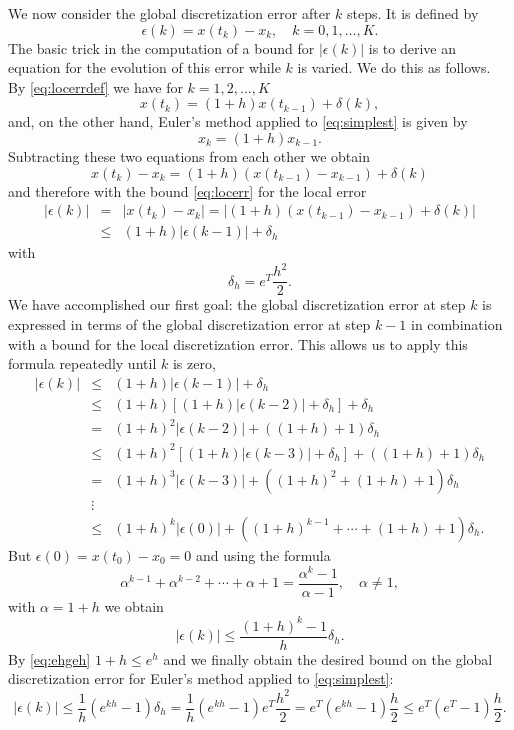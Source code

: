 \documentclass{ximera}
\begin{document}
We now consider the global discretization error after $k$ steps.
It is defined by 
\[
\epsilon(k) = x(t_k) - x_k,\quad k=0,1,\ldots,K.
\]
The basic trick in the computation of a bound for $|\epsilon(k)|$
is to derive an equation for the evolution of this
error while $k$ is varied.  We do this as follows.  
By \eqref{eq:locerrdef} we have for $k=1,2,\ldots,K$
\[
x(t_k)=(1+h)x(t_{k-1})+\delta(k), 
\]
and, on the other hand, Euler's method applied to
\eqref{eq:simplest} is given by 
\[
x_k = (1+h)x_{k-1}.
\]
Subtracting these two equations from each other we obtain
\[
x(t_k) - x_k = (1+h)(x(t_{k-1})-x_{k-1})+\delta(k)
\]
and therefore with the bound \eqref{eq:locerr} for the local error
\begin{eqnarray*}
|\epsilon(k)| & = & |x(t_k) - x_k| =
|(1+h)(x(t_{k-1})-x_{k-1})+\delta(k)|\\ 
& \le & (1+h)|\epsilon(k-1)|+\delta_h
\end{eqnarray*}
with 
\begin{equation} \label{eq:euldh}
\delta_h = e^T\frac{h^2}{2}.
\end{equation}
We have accomplished our first goal: the global 
discretization error 
at step $k$ is expressed
in terms of the global discretization error at step $k-1$ in 
combination with a bound for the local discretization error.  
This allows us to apply this formula repeatedly until $k$ is zero,
\begin{equation} \label{eq:globest}
\begin{array}{rcl}
|\epsilon(k)|&\le&(1+h)|\epsilon(k-1)|+\delta_h\\
&\le& (1+h)[(1+h)|\epsilon(k-2)|+\delta_h]+\delta_h\\ 
&=& (1+h)^2|\epsilon(k-2)| + ((1+h) + 1)\delta_h\\
&\le& (1+h)^2[(1+h)|\epsilon(k-3)|+\delta_h] + ((1+h) + 1)\delta_h\\
&=& (1+h)^3|\epsilon(k-3)| + ((1+h)^2 + (1+h) + 1)\delta_h\\
&\vdots& \\
&\le & (1+h)^k|\epsilon(0)| + ((1+h)^{k-1} +\cdots + (1+h) + 1)\delta_h.
\end{array}
\end{equation}
But $\epsilon(0)=x(t_0) - x_0=0$ and using the formula
\[
\alpha^{k-1} + \alpha^{k-2} +\cdots + \alpha + 1=
\frac{\alpha^k -1}{\alpha-1},\quad \alpha \not=1,
\]
with $\alpha = 1+h$ we obtain
\[
|\epsilon(k)| \le \frac{(1+h)^k -1}{h}\delta_h.
\]
By \eqref{eq:ehgeh} $1+h\le e^h$ and we finally
obtain the desired bound on the global 
discretization error
for Euler's method applied to \eqref{eq:simplest}:
\begin{equation} \label{eq:globerr}
|\epsilon(k)| \le \frac{1}{h} (e^{kh}-1)\delta_h=
\frac{1}{h}(e^{kh}-1)e^T\frac{h^2}{2} = e^T(e^{kh}-1)\frac{h}{2}
\le e^T(e^T-1)\frac{h}{2}.
\end{equation}
\end{document}

